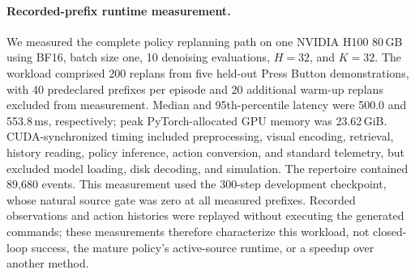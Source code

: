 \paragraph{Recorded-prefix runtime measurement.}
We measured the complete policy replanning path on one NVIDIA H100 80\,GB
using BF16, batch size one, 10 denoising evaluations, $H=32$, and $K=32$.
The workload comprised 200 replans from five held-out Press Button
demonstrations, with 40 predeclared prefixes per episode and 20 additional
warm-up replans excluded from measurement.
Median and 95th-percentile latency were 500.0 and 553.8\,ms, respectively;
peak PyTorch-allocated GPU memory was 23.62\,GiB.
CUDA-synchronized timing included preprocessing, visual encoding,
retrieval, history reading, policy inference, action conversion, and
standard telemetry, but excluded model loading, disk decoding, and simulation.
The repertoire contained 89,680 events.
This measurement used the 300-step development checkpoint, whose natural
source gate was zero at all measured prefixes.
Recorded observations and action histories were replayed without executing
the generated commands; these measurements therefore characterize this
workload, not closed-loop success, the mature policy's active-source runtime,
or a speedup over another method.
